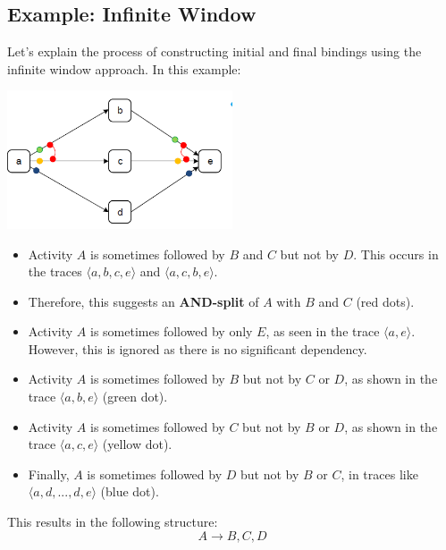 \subsection{Example: Infinite Window}
Let's explain the process of constructing initial and final bindings using the infinite window approach. In this example:
\begin{center}
    \includegraphics[width=0.5\textwidth]{capitolo 6/6 infinite window.png} %
\end{center}

\begin{itemize}
    \item Activity \(A\) is sometimes followed by \(B\) and \(C\) but not by \(D\). This occurs in the traces \(\langle a, b, c, e \rangle\) and \(\langle a, c, b, e \rangle\).
    \item Therefore, this suggests an \textbf{AND-split} of \(A\) with \(B\) and \(C\) (red dots).
    \item Activity \(A\) is sometimes followed by only \(E\), as seen in the trace \(\langle a, e \rangle\). However, this is ignored as there is no significant dependency. 
    \item Activity \(A\) is sometimes followed by \(B\) but not by \(C\) or \(D\), as shown in the trace \(\langle a, b, e \rangle\) (green dot).
    \item Activity \(A\) is sometimes followed by \(C\) but not by \(B\) or \(D\), as shown in the trace \(\langle a, c, e \rangle\) (yellow dot).
    \item Finally, \(A\) is sometimes followed by \(D\) but not by \(B\) or \(C\), in traces like \(\langle a, d, ..., d, e \rangle\) (blue dot).
\end{itemize}

This results in the following structure:
\[
A \rightarrow B, C, D
\]

